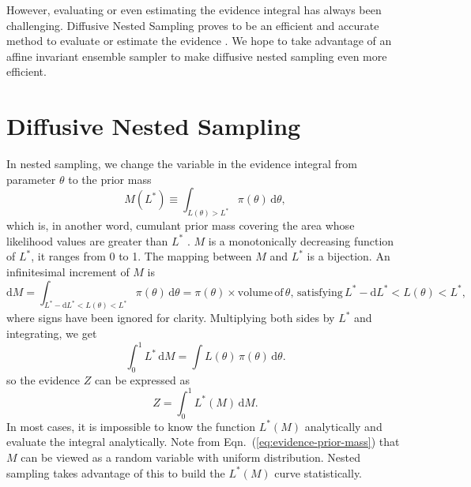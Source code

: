 \documentclass[letterpaper, preprint]{aastex}
\begin{document}
However, evaluating or even estimating the evidence integral has always been challenging. Diffusive Nested Sampling proves to be an efficient and accurate method to evaluate or estimate the evidence \citep{brewer11a}. We hope to take advantage of an affine invariant ensemble sampler \citep{goodman10a, hou12a, foreman-mackey13a} to make diffusive nested sampling even more efficient.


\section{Diffusive Nested Sampling}

In nested sampling, we change the variable in the evidence integral from parameter $\theta$ to the prior mass
\begin{equation}
M(L^*) \equiv \int_{L(\theta)>L^*}\!\pi(\theta)\,\mathrm{d}\theta,
 \label{eq:prior-mass}
\end{equation}
which is, in another word, cumulant prior mass covering the area whose likelihood values are greater than $L^*$ \citep{skilling06a}. $M$ is a monotonically decreasing function of $L^*$, it ranges from 0 to 1. The mapping between $M$ and $L^*$ is a bijection. An infinitesimal increment of $M$ is
\begin{equation}
\mathrm{d}M=\int_{L^*-\mathrm{d}L^*<L(\theta)<L^*}\!\pi(\theta)\,\mathrm{d}\theta = \pi(\theta)\times \mathrm{volume\,of}\,\theta,\,\mathrm{satisfying}\, L^*-\mathrm{d}L^*<L(\theta)<L^*,
\label{eq:dM}
\end{equation}
where signs have been ignored for clarity. Multiplying both sides by $L^*$ and integrating, we get
\begin{equation}
\int^1_0\! L^*\,\mathrm{d}M=\int\!L(\theta)\,\pi(\theta)\,\mathrm{d}\theta.
\label{eq:int-dM}
\end{equation}
so the evidence $Z$ can be expressed as
\begin{equation}
Z=\int^1_0\! L^*(M)\,\mathrm{d}M.
 \label{eq:evidence-prior-mass}
\end{equation}
In most cases, it is impossible to know the function $L^*(M)$ analytically and evaluate the integral analytically. Note from Eqn.~(\ref{eq:evidence-prior-mass}) that $M$ can be viewed as a random variable with uniform distribution. Nested sampling takes advantage of this to build the $L^*(M)$ curve statistically.
\end{document}
